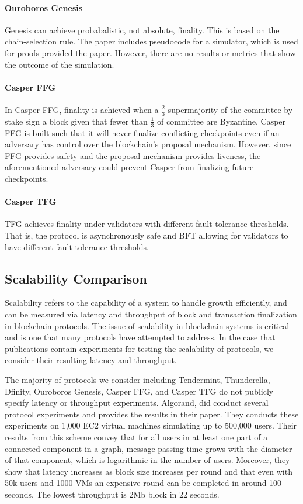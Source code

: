 \documentclass[10pt,journal,compsoc]{IEEEtran}
\begin{document}
\paragraph{Ouroboros Genesis} Genesis can achieve probabalistic, not absolute, finality. This is based on the chain-selection rule. The paper includes pseudocode for a simulator, which is used for proofs provided the paper. However, there are no results or metrics that show the outcome of the simulation. 

\paragraph{Casper FFG} In Casper FFG, finality is achieved when a \(\frac{2}{3}\) supermajority of the committee by stake sign a block given that fewer than \(\frac{1}{3}\) of committee are Byzantine. Casper FFG is built such that it will never finalize conflicting checkpoints even if an adversary has control over the blockchain's proposal mechanism. However, since FFG provides safety and the proposal mechanism provides liveness, the aforementioned adversary could prevent Casper from finalizing future checkpoints.

\paragraph{Casper TFG} TFG achieves finality under validators with different fault tolerance thresholds. That is, the protocol is asynchronously safe and BFT allowing for validators to have different fault tolerance thresholds.

\subsection{Scalability Comparison}
Scalability refers to the capability of a system to handle growth efficiently, and can be measured via latency and throughput of block and transaction finalization in blockchain protocols. The issue of scalability in blockchain systems is critical and is one that many protocols have attempted to address. In the case that publications contain experiments for testing the scalability of protocols, we consider their resulting latency and throughput. 

The majority of protocols we consider including Tendermint, Thunderella, Dfinity, Ouroboros Genesis, Casper FFG, and Casper TFG do not publicly specify latency or throughput experiments. Algorand, did conduct several protocol experiments and provides the results in their paper. They conducts these experiments on 1,000 EC2 virtual machines simulating up to 500,000 users. Their results from this scheme convey that for all users in at least one part of a connected component in a graph, message passing time grows with the diameter of that component, which is logarithmic in the number of users. Moreover, they show that latency increases as block size increases per round and that even with 50k users and 1000 VMs an expensive round can be completed in around 100 seconds. The lowest throughput is 2Mb block in 22 seconds.  
 
\end{document}
